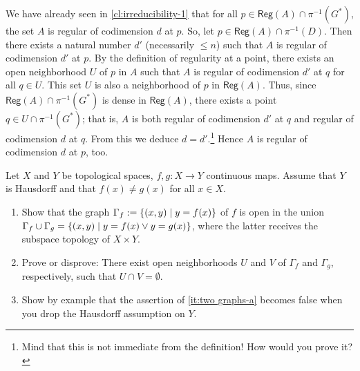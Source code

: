 \documentclass[a4paper]{amsart}
\newcommand{\Reg}[1]{\mathsf{Reg}(#1)}
\theoremstyle{remark}
\numberwithin{equation}{question}
\DeclarePairedDelimiter\set{\{}{\}}
\begin{document}
\begin{solution}
\begin{solenum}
\item We have already seen in \cref{cl:irreducibility-1} that for all $p \in \Reg A \cap \pi^{-1}(G^*)$, the set $A$ is regular of codimension $d$ at $p$. So, let $p \in \Reg A \cap \pi^{-1}(D)$. Then there exists a natural number $d'$ (necessarily $\le n$) such that $A$ is regular of codimension $d'$ at $p$. By the definition of regularity at a point, there exists an open neighborhood $U$ of $p$ in $A$ such that $A$ is regular of codimension $d'$ at $q$ for all $q \in U$. This set $U$ is also a neighborhood of $p$ in $\Reg A$. Thus, since $\Reg A \cap \pi^{-1}(G^*)$ is dense in $\Reg A$, there exists a point $q \in U \cap \pi^{-1}(G^*)$; that is, $A$ is both regular of codimension $d'$ at $q$ and regular of codimension $d$ at $q$. From this we deduce $d = d'$.\footnote{Mind that this is not immediate from the definition! How would you prove it?} Hence $A$ is regular of codimension $d$ at $p$, too.
\end{solenum}
\end{solution}

\begin{question}[name=Exercise*, subtitle=The topology of a disjoint union of two graphs]
\label{qu:two graphs}
Let $X$ and $Y$ be topological spaces, $f,g \colon X \to Y$ continuous maps. Assume that $Y$ is Hausdorff and that $f(x) \ne g(x)$ for all $x \in X$.
\begin{enumerate}
\item Show that the graph $\Gamma_f := \set{(x,y) \mid y = f(x)}$ of $f$ is open in the union $\Gamma_f \cup \Gamma_g = \set{(x,y) \mid y = f(x) \lor y = g(x)}$, where the latter receives the subspace topology of $X \times Y$.\label{it:two graphs-a}
\item Prove or disprove: There exist open neighborhoods $U$ and $V$ of $\Gamma_f$ and $\Gamma_g$, respectively, such that $U \cap V = \emptyset$.
\item Show by example that the assertion of \cref{it:two graphs-a} becomes false when you drop the Hausdorff assumption on $Y$.
\end{enumerate}
\end{question}
\end{document}
